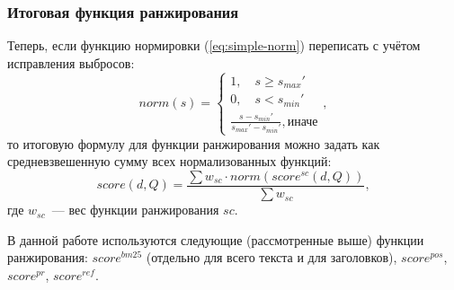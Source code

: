 \subsubsection{Итоговая функция ранжирования}
Теперь, если функцию нормировки (\ref{eq:simple-norm}) переписать с учётом исправления выбросов:
\begin{equation}
  norm(s) = \begin{cases}
    1, \quad s \geq s_{max}'\\
    0, \quad s < s_{min}'\\
    \frac{s-s_{min}'}{s_{max}' - s_{min}'}, \text{иначе}
  \end{cases},
\end{equation}
то итоговую формулу для функции ранжирования можно задать как средневзвешенную сумму всех нормализованных функций:
\begin{equation}
  score(d, Q)=\frac{\sum w_{sc}\cdot norm(score^{sc}(d, Q))}{\sum w_{sc}},
\end{equation}
где $w_{sc}$~--- вес функции ранжирования $sc$.

В данной работе используются следующие (рассмотренные выше) функции ранжирования: $score^{bm25}$ (отдельно для всего текста и для заголовков), $score^{pos}$, $score^{pr}$, $score^{ref}$.
